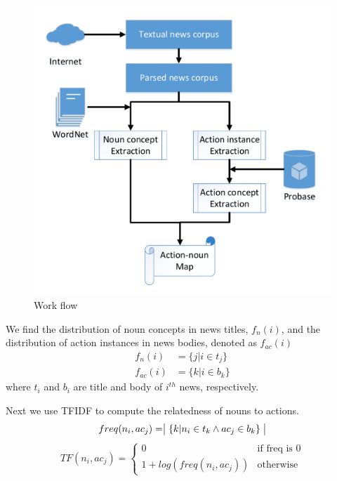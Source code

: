 \begin{figure}[!htp]
 \centering
 \includegraphics[width=\linewidth]{img/flow.pdf}
 \caption{Work flow}
\end{figure}


We find the distribution of noun concepts in news titles, $f_n(i)$, and the distribution of action instances in news bodies,
denoted as $f_{ac}(i)$
\begin{align*}
    f_n(i) & = \{ j |  i \in t_j \} \\
    f_{ac}(i) &= \{ k | i \in b_k \}
\end{align*}
where $t_i$ and $b_i$ are title and body of $i^{th}$ news, respectively.

Next we use TFIDF to compute the relatedness of nouns to actions.
\begin{equation*}
    freq(n_i, ac_j) = \bigm| \{ k | n_i \in t_k \land ac_j \in b_k \} \bigm|
\end{equation*}
\begin{equation*}
    TF(n_i, ac_j) = \begin{cases} 0 &\mbox{if freq is 0} \\
        1 + log(freq(n_i, ac_j)) &\mbox{otherwise}
    \end{cases}
\end{equation*}



